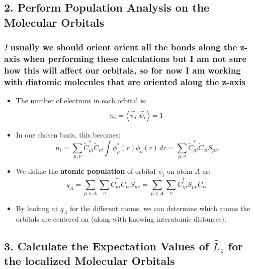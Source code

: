 \documentclass{article}
\begin{document}
\subsection*{2. Perform Population Analysis on the Molecular Orbitals}
\subsubsection*{\textit{\textbf{!}} usually we should orient orient all the bonds along the z-axis when performing these calculations but I am not sure how this will affect our orbitals, so for now I am working with diatomic molecules that are oriented along the z-axis}   

\begin{itemize}
    \item The number of electrons in each orbital is:
    \[
    n_i = \braket{\widetilde{\psi}_i} = 1
    \]

    \item In our chosen basis, this becomes:
    \[
    n_i = \sum_{\mu, \nu} \widetilde{C}_{\mu i}^{*} \widetilde{C}_{\nu i} \int \phi_{\mu}^{*}(r) \phi_{\nu}(r) \,dr = \sum_{\mu, \nu} \widetilde{C}_{\mu i}^{*} \widetilde{C}_{\nu i} S_{\mu \nu}
    \]

    \item We define the \textbf{atomic population} of orbital \( \psi_i \) on atom \( A \) as:
    \[
    q_A = \sum_{\mu \in A} \sum_{\nu} \widetilde{C}_{\mu i}^{*} \widetilde{C}_{\nu i} S_{\mu \nu} = \sum_{\mu \in A} \sum_{\nu} \widetilde{C}_{i \mu}^{\dagger} S_{\mu \nu} \widetilde{C}_{\nu i}
    \]

    \item By looking at \( q_A \) for the different atoms, we can determine which atoms the orbitals are centered on (along with knowing interatomic distances).
\end{itemize}

\subsection*{3. Calculate the Expectation Values of \( \hat{L}_z \) for the localized Molecular Orbitals}
\end{document}
